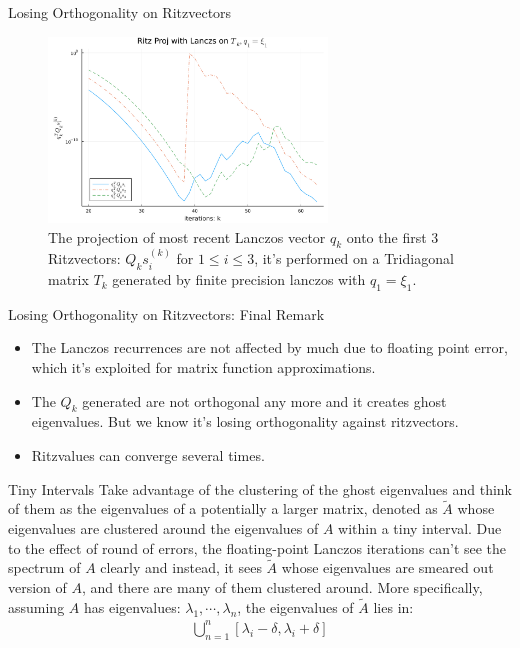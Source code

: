 \documentclass{beamer}
\begin{document}
    \begin{frame}{Losing Orthogonality on Ritzvectors}
        \begin{figure}[H]
            \centering 
            \includegraphics[width=20em]{ritz_proj_tridiagonal.png}
            \caption{The projection of most recent Lanczos vector $q_k$ onto the first 3 Ritzvectors: $Q_ks_i^{(k)}$ for $1\le i \le 3$, it's performed on a Tridiagonal matrix $T_k$ generated by finite precision lanczos with $q_1 = \xi_1$. }
        \end{figure}
    \end{frame}
    \begin{frame}{Losing Orthogonality on Ritzvectors: Final Remark}
        \begin{itemize}
            \item The Lanczos recurrences are not affected by much due to floating point error, which it's exploited for matrix function approximations. 
            \item The $Q_k$ generated are not orthogonal any more and it creates ghost eigenvalues. But we know it's losing orthogonality against ritzvectors. 
            \item Ritzvalues can converge several times. 
        \end{itemize}
    \end{frame}
    \begin{frame}{Tiny Intervals}
        Take advantage of the clustering of the ghost eigenvalues and think of them as the eigenvalues of a potentially a larger matrix, denoted as $\tilde{A}$ whose eigenvalues are clustered around the eigenvalues of $A$ within a tiny interval. Due to the effect of round of errors, the floating-point Lanczos iterations can't see the spectrum of $A$ clearly and instead, it sees $\tilde{A}$ whose eigenvalues are smeared out version of $A$, and there are many of them clustered around. More specifically, assuming $A$ has eigenvalues: $\lambda_1, \cdots, \lambda_n$, the eigenvalues of $\tilde{A}$ lies in: 
        \begin{align}
            \bigcup_{n = 1}^n[\lambda_i - \delta, \lambda_i + \delta]
        \end{align}
    \end{frame}
    
\end{document}
